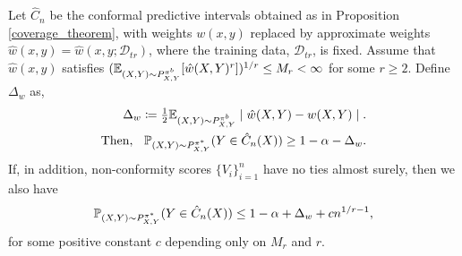 \begin{proposition}\label{prop2}
Let $\hat{C}_n$ be the conformal predictive intervals obtained as in Proposition \ref{coverage_theorem}, with weights $w(x,y)$ replaced by approximate weights $\hat{w}(x,y) = \hat{w}(x,y;\mathcal{D}_{tr})$, where the training data, $\mathcal{D}_{tr}$, is fixed. Assume that $\hat{w}(x, y)$ satisfies $(\mathbb{E}_{(X,Y)\sim P^{\pi^b}_{X,Y}}[\hat{w}(X,Y)^r])^{1/r} \leq M_r < \infty$ for some $r \geq 2$.
Define $\Delta_w$ as,
\begin{align}
    \Delta_w \coloneqq \tfrac{1}{2}\mathbb{E}_{(X,Y)\sim P^{\pi^b}_{X,Y}} \mid \hat{w}(X,Y) - w(X,Y)\mid  \label{delta_w}.\\
    \text{Then, } \hspace{0.2cm} \mathbb{P}_{(X,Y)\sim P^{\pi^*}_{X,Y}}(Y\in \hat{C}_n(X)) \geq 1-\alpha - \Delta_w.\nonumber
\end{align}
If, in addition, non-conformity scores $\{V_i\}_{i=1}^n$ have no ties almost surely, then we also have
\begin{align}
    \mathbb{P}_{(X,Y)\sim P^{\pi^*}_{X,Y}}(Y\in \hat{C}_n(X)) \leq 1-\alpha + \Delta_w + cn^{1/r-1}, \nonumber
\end{align}
for some positive constant $c$ depending only on $M_r$ and $r$.
\end{proposition}

